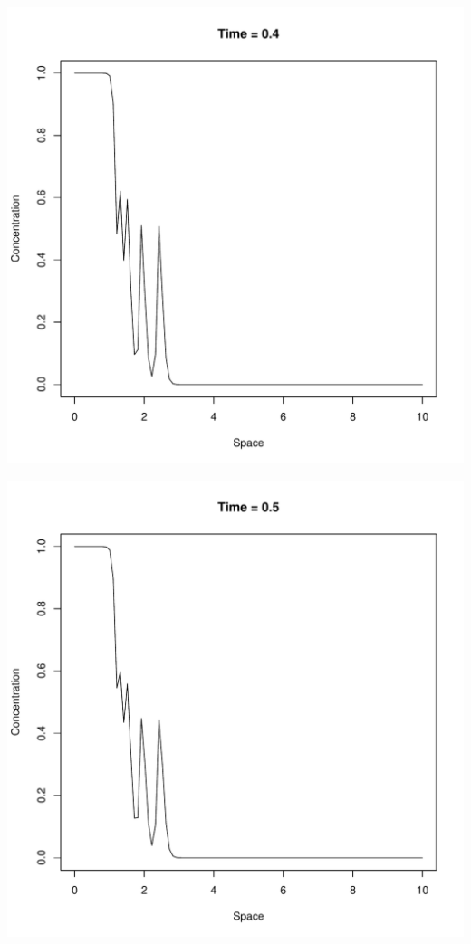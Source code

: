 \documentclass{tufte-handout}\usepackage[]{graphicx}\usepackage[]{xcolor}
\makeatletter
\def\maxwidth{ %
  \ifdim\Gin@nat@width>\linewidth
    \linewidth
  \else
    \Gin@nat@width
  \fi
}
\newenvironment{knitrout}{}{} %
\makeatother
\begin{document}
\begin{knitrout}
\includegraphics[width=\maxwidth]{figure/unnamed-chunk-2-5} 

\includegraphics[width=\maxwidth]{figure/unnamed-chunk-2-6} 


\end{knitrout}
\end{document}
